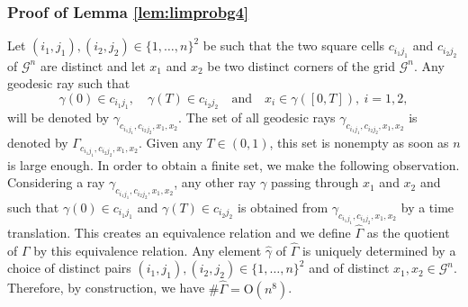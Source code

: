 \documentclass[JEP,XML,SOM,Unicode, NoEqCountersInSection,NoFloatCountersInSection,published]{cedram}
\theoremstyle{definition}
\begin{document}
\subsubsection{Proof of Lemma \ref{lem:limprobg4}}
Let $(i_1,j_1), (i_2,j_2)\in \{1,\ldots,n\}^2$ be such that the two square cells $c_{i_1j_1}$ and $c_{i_2j_2}$ of $\mathcal{G}^n$ are distinct and let $x_1$ and $x_2$ be two distinct corners of the grid $\mathcal{G}^n$. Any geodesic ray such that
\[
\gamma(0)\in c_{i_1j_1}, \quad \gamma(T)\in c_{i_2j_2}\quad \text{and}\quad x_i\in \gamma([0,T]), \ i=1,2,
\]
will be denoted by $\gamma_{c_{i_1j_1},c_{i_2j_2},x_1,x_2}$.
{The set of all geodesic rays $\gamma_{c_{i_1j_1},c_{i_2j_2},x_1,x_2}$ is denoted by $\Gamma_{c_{i_1j_1},c_{i_2j_2},x_1,x_2}$. Given any $T\in(0,1)$, this set is nonempty as soon as $n$ is large enough.
In order to obtain a finite set, we make the following observation. Considering a ray $\gamma_{c_{i_1j_1},c_{i_2j_2},x_1,x_2}$, any other ray $\gamma$ passing through $x_1$ and $x_2$ and such that $\gamma(0)\in c_{i_1j_1}$ and $\gamma(T)\in c_{i_2j_2}$ is obtained from $\gamma_{c_{i_1j_1},c_{i_2j_2},x_1,x_2}$ by a time translation. This creates an equivalence relation and we define $\hat \Gamma$ as the quotient of $\Gamma$ by this equivalence relation. Any element $\hat\gamma$ of $\hat\Gamma$ is uniquely determined by a choice of distinct pairs $(i_1,j_1), (i_2,j_2)\in \{1,\ldots,n\}^2$ and of distinct $x_1,x_2\in \mathcal{G}^n$.
}
Therefore, by construction, we have $\#\hat\Gamma=\mathrm{O}(n^8)$.
\end{document}
